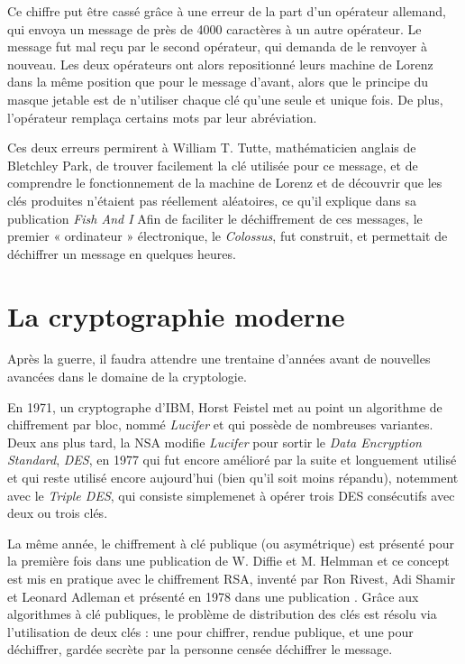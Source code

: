 Ce chiffre put être cassé grâce à une erreur de la part d'un opérateur
allemand, qui envoya un message de près de 4000 caractères à un autre
opérateur. Le message fut mal reçu par le second opérateur, qui
demanda de le renvoyer à nouveau. Les deux opérateurs ont alors
repositionné leurs machine de Lorenz dans la même position que pour
le message d'avant, alors que le principe du masque jetable est de
n'utiliser chaque clé qu'une seule et unique fois. De plus,
l'opérateur remplaça certains mots par leur abréviation. 

Ces deux erreurs permirent à William T. Tutte, mathématicien anglais
de Bletchley Park, de trouver
facilement la clé utilisée pour ce message, et de comprendre le
fonctionnement de la machine de Lorenz et de découvrir que les clés
produites n'étaient pas réellement aléatoires, ce qu'il explique dans
sa publication \emph{Fish And I}\cite{FISHAndI}
Afin de faciliter le déchiffrement de ces messages, le
premier « ordinateur » électronique, le \emph{Colossus}, fut
construit, et permettait de déchiffrer un message en quelques heures.


\section{La cryptographie moderne}
Après la guerre, il faudra attendre une trentaine d'années avant de
nouvelles avancées dans le domaine de la cryptologie. 

En 1971, un cryptographe d'IBM, Horst Feistel met au point un
algorithme de chiffrement par bloc, nommé \emph{Lucifer} et qui
possède de nombreuses variantes. Deux ans plus tard, la NSA modifie
\emph{Lucifer} pour sortir le \emph{Data Encryption Standard},
\emph{DES}, en 1977 qui fut encore amélioré par la suite et longuement
utilisé et qui reste utilisé encore aujourd'hui (bien qu'il soit moins
répandu), notemment avec le \emph{Triple DES}, qui consiste
simplemenet à opérer trois DES consécutifs avec deux ou trois clés. %

La même année, le chiffrement à clé publique (ou asymétrique) est
présenté pour la première fois dans une publication de W. Diffie et
M. Helmman \cite{NewDirectionsInCryptography} et ce concept est mis en
pratique avec le chiffrement RSA, inventé par Ron Rivest, Adi Shamir
et Leonard Adleman et présenté en 1978 dans une publication 
\cite{RSAPaper}. Grâce aux algorithmes à clé publiques, le problème de
distribution des clés est résolu via l'utilisation de deux clés : une
pour chiffrer, rendue publique, et une pour déchiffrer, gardée secrète
par la personne censée déchiffrer le message.

